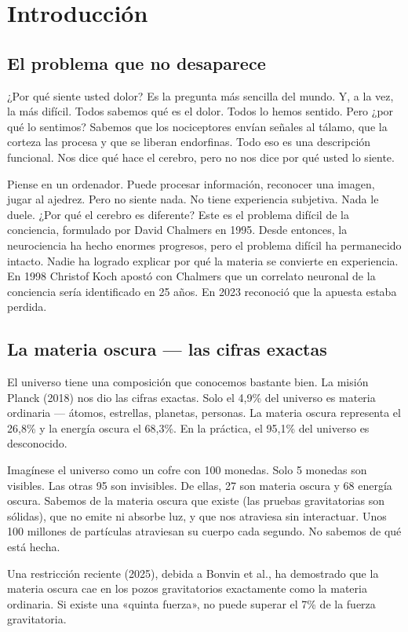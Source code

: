 \section{Introducción}

\subsection{El problema que no desaparece}
¿Por qué siente usted dolor? Es la pregunta más sencilla del mundo. Y, a la vez, la más difícil. Todos sabemos qué es el dolor. Todos lo hemos sentido. Pero ¿por qué lo sentimos? Sabemos que los nociceptores envían señales al tálamo, que la corteza las procesa y que se liberan endorfinas. Todo eso es una descripción funcional. Nos dice qué hace el cerebro, pero no nos dice por qué usted lo siente.

Piense en un ordenador. Puede procesar información, reconocer una imagen, jugar al ajedrez. Pero no siente nada. No tiene experiencia subjetiva. Nada le duele. ¿Por qué el cerebro es diferente? Este es el problema difícil de la conciencia, formulado por David Chalmers en 1995. Desde entonces, la neurociencia ha hecho enormes progresos, pero el problema difícil ha permanecido intacto. Nadie ha logrado explicar por qué la materia se convierte en experiencia. En 1998 Christof Koch apostó con Chalmers que un correlato neuronal de la conciencia sería identificado en 25 años. En 2023 reconoció que la apuesta estaba perdida.

\subsection{La materia oscura --- las cifras exactas}
El universo tiene una composición que conocemos bastante bien. La misión Planck (2018) nos dio las cifras exactas. Solo el 4,9\% del universo es materia ordinaria --- átomos, estrellas, planetas, personas. La materia oscura representa el 26,8\% y la energía oscura el 68,3\%. En la práctica, el 95,1\% del universo es desconocido.

Imagínese el universo como un cofre con 100 monedas. Solo 5 monedas son visibles. Las otras 95 son invisibles. De ellas, 27 son materia oscura y 68 energía oscura. Sabemos de la materia oscura que existe (las pruebas gravitatorias son sólidas), que no emite ni absorbe luz, y que nos atraviesa sin interactuar. Unos 100 millones de partículas atraviesan su cuerpo cada segundo. No sabemos de qué está hecha.

Una restricción reciente (2025), debida a Bonvin et al., ha demostrado que la materia oscura cae en los pozos gravitatorios exactamente como la materia ordinaria. Si existe una «quinta fuerza», no puede superar el 7\% de la fuerza gravitatoria.

